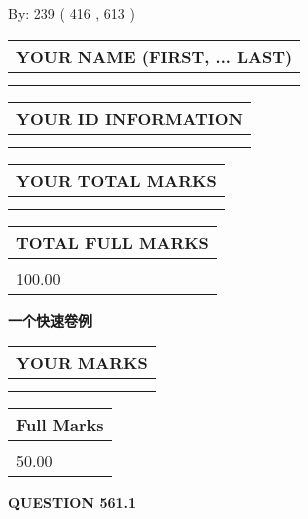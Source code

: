 \documentclass{ctexart}
\begin{document}
   
\hspace{1.0in} By: 
 239 ( 416 ,  613 )
   
   
   
   
\newpage 
\setcounter{page}{ 
   561001 } 
   
   
   
   
\noindent\begin{tabular}{|l|}
\hline
YOUR NAME (FIRST, ... LAST)  \\
\hline
 \\ 
 \\ 
\hline
\end{tabular}
\hspace{0.05in} \begin{tabular}{|l|}
\hline
 YOUR   ID   INFORMATION  \\
\hline
 \\ 
 \\ 
\hline
\end{tabular}
   
   
\vspace{0.2in}\noindent\begin{tabular}{|l|}
\hline
YOUR TOTAL MARKS  \\
\hline
 \\ 
 \\ 
\hline
\end{tabular}
\hspace{0.05in} \begin{tabular}{|l|}
\hline
TOTAL FULL MARKS  \\
\hline
 \\ 
100.00 \\
\hline
\end{tabular}
   
   
 \vspace{0.2in}
{\LARGE {\textbf{ 一个快速卷例}}}
   
   
  
\vspace{0.2in}
  
\noindent\begin{tabular}{|l|}
\hline
 YOUR MARKS  \\
\hline
 \\ 
 \\ 
\hline
\end{tabular}
\hspace{0.05in} \begin{tabular}{|l|}
\hline
 Full Marks  \\
\hline
 \\ 
50.00 \\
\hline
\end{tabular}
{\textbf{\Large{QUESTION
561.1 
}}}
  
\end{document}
